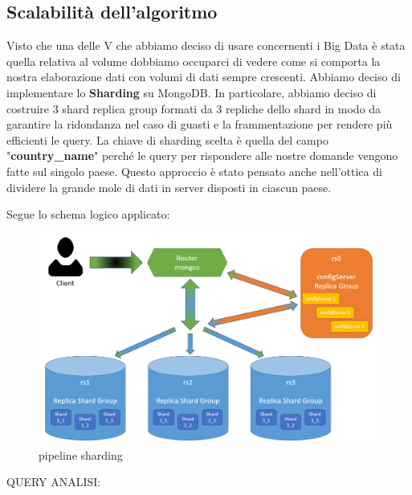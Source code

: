 \documentclass[10pt, a4paper,openany]{article}
\begin{document}
\subsection*{Scalabilità dell'algoritmo}

Visto che una delle V che abbiamo deciso di usare concernenti i Big Data è stata quella relativa al volume dobbiamo occuparci di vedere come si comporta la nostra elaborazione dati con volumi di dati sempre crescenti. Abbiamo deciso di implementare lo \textbf{Sharding} su MongoDB. In particolare, abbiamo deciso di costruire 3 shard replica group formati da 3 repliche dello shard in modo da garantire la ridondanza nel caso di guasti e la frammentazione per rendere più efficienti le query. La chiave di sharding scelta è quella del campo "\textbf{country\_name}" perché le query per rispondere alle nostre domande vengono fatte sul singolo paese. Questo approccio è stato pensato anche nell'ottica di dividere la grande mole di dati in server disposti in ciascun paese. 

Segue lo schema logico applicato:
\begin{figure}[H]
	\centering
	\includegraphics[width=0.8\linewidth]{pics/sharding.png}
	\caption{pipeline sharding}
\end{figure}

QUERY ANALISI:



\end{document}
